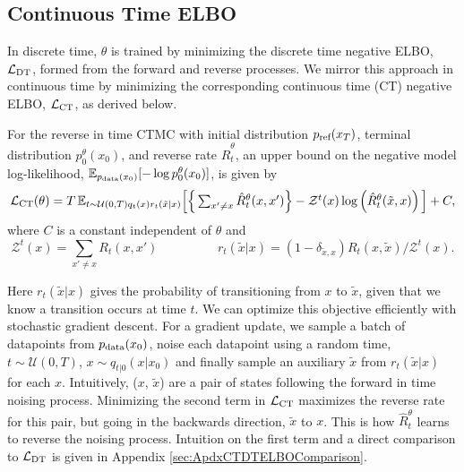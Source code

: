 \documentclass{article}
\begin{document}
\subsection{Continuous Time ELBO}
In discrete time, $\theta$ is trained by minimizing the discrete time negative ELBO, $\mathcal{L}_{\textup{DT}}$, formed from the forward and reverse processes. We mirror this approach in continuous time by minimizing the corresponding continuous time (CT) negative ELBO, $\mathcal{L}_{\textup{CT}}$, as derived below.
\begin{proposition}
\label{prop:CTELBO}
For the reverse in time CTMC with initial distribution $p_{\textrm{ref}}(x_T)$, terminal distribution $p_0^\theta(x_0)$, and reverse rate $\hat{R}_t^\theta$, an upper bound on the negative model log-likelihood, $\mathbb{E}_{p_{\textup{data}}(x_0)}[ - \log p_0^\theta(x_0)]$, is given by
\begin{equation}
   \textstyle \mathcal{L}_{\textup{CT}}(\theta) = T \, \mathbb{E}_{t\sim \mathcal{U}(0, T) q_t(x) r_t(\tilde{x}|x)} \Big[ \Big\{ \sum_{x' \neq x} \hat{R}_t^\theta(x, x') \Big\} - \mathcal{Z}^t(x) \log \left(\hat{R}_t^\theta(\tilde{x}, x) \right) \Big] + C,
\end{equation}
where $C$ is a constant independent of $\theta$ and
\begin{equation}
    \textstyle \mathcal{Z}^t(x) = \sum_{x' \neq x} R_t(x, x') \hspace{2cm} r_t(\tilde{x}|x) = (1 - \delta_{\tilde{x}, x} ) R_t(x, \tilde{x})/\mathcal{Z}^t(x).
\end{equation}



\end{proposition}

Here $r_t(\tilde{x} | x)$ gives the probability of transitioning from $x$ to $\tilde{x}$, given that we know a transition occurs at time $t$. We can optimize this objective efficiently with stochastic gradient descent. For a gradient update, we sample a batch of datapoints from $p_{\textup{data}}(x_0)$, noise each datapoint using a random time, $t \sim \mathcal{U}(0, T)$, $x \sim q_{t|0}(x | x_0)$ and finally sample an auxiliary $\tilde{x}$ from $r_t(\tilde{x} | x)$ for each $x$.
Intuitively, ($x$, $\tilde{x}$) are a pair of states following the forward in time noising process. Minimizing the second term in $\mathcal{L}_{\textup{CT}}$ maximizes the reverse rate for this pair, but going in the backwards direction, $\tilde{x}$ to $x$. This is how $\hat{R}_t^\theta$ learns to reverse the noising process. Intuition on the first term and a direct comparison to $\mathcal{L}_{\textup{DT}}$ is given in Appendix \ref{sec:ApdxCTDTELBOComparison}.
\end{document}
